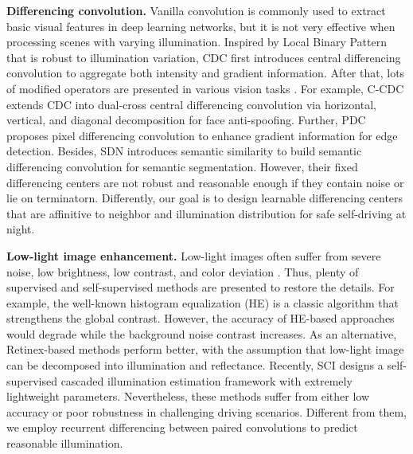 \documentclass[lettersize,journal]{IEEEtran}
\begin{document}
\textbf{Differencing convolution.} 
Vanilla convolution is commonly used to extract basic visual features in deep learning networks, but it is not very effective when processing scenes with varying illumination. Inspired by Local Binary Pattern \cite{boulkenafet2015face} that is robust to illumination variation, CDC \cite{yu2020searching} first introduces central differencing convolution to aggregate both intensity and gradient information. After that, lots of modified operators are presented in various vision tasks \cite{yu2020fas,su2021pixel,cao2023deep,tan2022semantic}. For example, C-CDC \cite{yu2021dual} extends CDC into dual-cross central differencing convolution via horizontal, vertical, and diagonal decomposition for face anti-spoofing. Further, PDC \cite{su2021pixel} proposes pixel differencing convolution to enhance gradient information for edge detection. Besides, SDN \cite{tan2022semantic} introduces semantic similarity to build semantic differencing convolution for semantic segmentation. However, their fixed differencing centers are not robust and reasonable enough if they contain noise or lie on terminatorn. Differently, our goal is to design learnable differencing centers that are affinitive to neighbor and illumination distribution for safe self-driving at night. 

\textbf{Low-light image enhancement.} 
Low-light images %
often suffer from severe noise, low brightness, low contrast, and color deviation \cite{li2021learning,zhang2023fast}. Thus, plenty of supervised \cite{zhang2021beyond,zhang2021better} and self-supervised \cite{guo2020zero,li2021learning,ma2022toward} methods are presented to restore the details. For example, the well-known histogram equalization (HE) \cite{pizer1987adaptive} is a classic algorithm that strengthens the global contrast. %
However, the accuracy of HE-based approaches would degrade while the background noise contrast increases. As an alternative, Retinex-based methods \cite{zhang2021beyond,liu2021retinex} perform better, with the assumption that low-light image can be decomposed into illumination and reflectance. Recently, SCI \cite{ma2022toward} designs a self-supervised cascaded illumination estimation framework with extremely lightweight parameters. Nevertheless, these methods suffer from either low accuracy or poor robustness in challenging driving scenarios. Different from them, we employ recurrent differencing between paired convolutions to predict reasonable illumination. 
\end{document}
